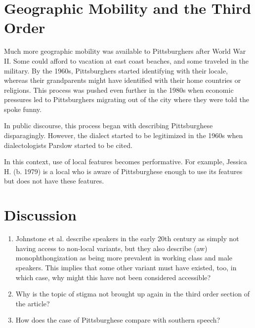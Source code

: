 \documentclass{article}
\begin{document}
  \section{Geographic Mobility and the Third Order}
    Much more geographic mobility was available to Pittsburghers after World War II.
    Some could afford to vacation at east coast beaches, and some traveled in the military.
    By the 1960s, Pittsburghers started identifying with their locale, whereas their grandparents might have identified with their home countries or religions.
    This process was pushed even further in the 1980s when economic pressures led to Pittsburghers migrating out of the city where they were told the spoke funny.

    In public discourse, this process began with describing Pittsburghese disparagingly.
    However, the dialect started to be legitimized in the 1960s when dialectologists Parslow started to be cited.

    In this context, use of local features becomes performative.
    For example, Jessica H. (b. 1979) is a local who is aware of Pittsburghese enough to use its features but does not have these features.

  \section{Discussion}
    \begin{enumerate}
      \item Johnstone et al. describe speakers in the early 20th century as simply not having access to non-local variants, but they also describe (aw) monophthongization as being more prevalent in working class and male speakers. This implies that some other variant must have existed, too, in which case, why might this have not been considered accessible?
      \item Why is the topic of stigma not brought up again in the third order section of the article?
      \item How does the case of Pittsburghese compare with southern speech?
    \end{enumerate}
\end{document}
